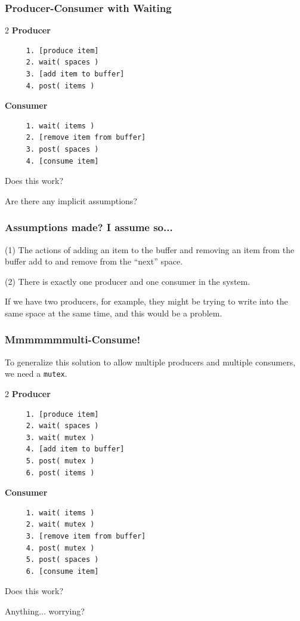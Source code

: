\begin{frame}[fragile]
	\frametitle{Producer-Consumer with Waiting}

	\begin{multicols}{2}
		\textbf{Producer}
		\begin{verbatim}
	 1. [produce item]
	 2. wait( spaces )
	 3. [add item to buffer]
	 4. post( items )
  \end{verbatim}
		\columnbreak
		\textbf{Consumer}
		\begin{verbatim}
	 1. wait( items )
	 2. [remove item from buffer]
	 3. post( spaces )
	 4. [consume item]
  \end{verbatim}
	\end{multicols}
	\vspace{-2em}

	Does this work?

	Are there any implicit assumptions?

\end{frame}

\begin{frame}
	\frametitle{Assumptions made? I assume so...}

	(1) The actions of adding an item to the buffer and removing an item from the buffer add to and remove from the ``next'' space.

	(2) There is exactly one producer and one consumer in the system.

	If we have two producers, for example, they might be trying to write into the same space at the same time, and this would be a problem.


\end{frame}


\begin{frame}[fragile]
	\frametitle{Mmmmmmmulti-Consume!}

	To generalize this solution to allow multiple producers and multiple consumers, we need a \texttt{mutex}.

	\begin{multicols}{2}
		\textbf{Producer}
		\begin{verbatim}
	 1. [produce item]
	 2. wait( spaces )
	 3. wait( mutex )
	 4. [add item to buffer]
	 5. post( mutex )
	 6. post( items )
  \end{verbatim}
		\columnbreak
		\textbf{Consumer}
		\begin{verbatim}
	 1. wait( items )
	 2. wait( mutex )
	 3. [remove item from buffer]
	 4. post( mutex )
	 5. post( spaces )
	 6. [consume item]
  \end{verbatim}
	\end{multicols}
	\vspace{-2em}

	Does this work?

	Anything... worrying?

\end{frame}


